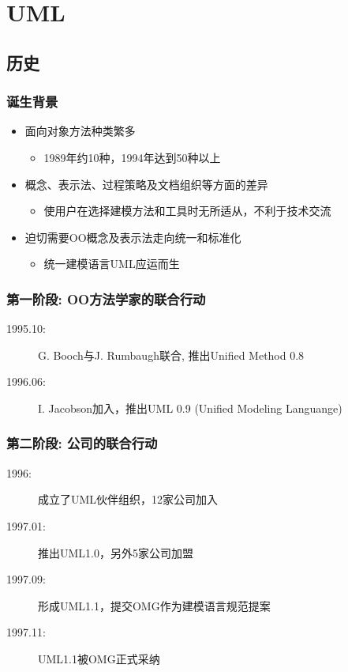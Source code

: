 \documentclass[compress]{beamer}
\begin{document}
\section{UML}

\subsection{历史}

\begin{frame}
  \frametitle{诞生背景}
  \begin{itemize}
    \item 面向对象方法种类繁多
      \begin{itemize}
        \item 1989年约10种，1994年达到50种以上
      \end{itemize}
    \item 概念、表示法、过程策略及文档组织等方面的差异
      \begin{itemize}
        \item 使用户在选择建模方法和工具时无所适从，不利于技术交流
      \end{itemize} 

    \item 迫切需要OO概念及表示法走向统一和标准化
      \begin{itemize}
        \item 统一建模语言UML应运而生
      \end{itemize}
  \end{itemize}
\end{frame}

\begin{frame}
  \frametitle{第一阶段: OO方法学家的联合行动}
  \begin{description}
    \item [1995.10:] G. Booch与J. Rumbaugh联合, 推出Unified Method 0.8
    \item [1996.06:] I. Jacobson加入，推出UML 0.9 (Unified Modeling
      Languange)
  \end{description}
\end{frame}

\begin{frame}
  \frametitle{第二阶段: 公司的联合行动}
  \begin{description}
    \item [1996:] 成立了UML伙伴组织，12家公司加入
    \item [1997.01:] 推出UML1.0，另外5家公司加盟
    \item [1997.09:] 形成UML1.1，提交OMG作为建模语言规范提案
    \item [1997.11:] UML1.1被OMG正式采纳
  \end{description}
\end{frame}
\end{document}

